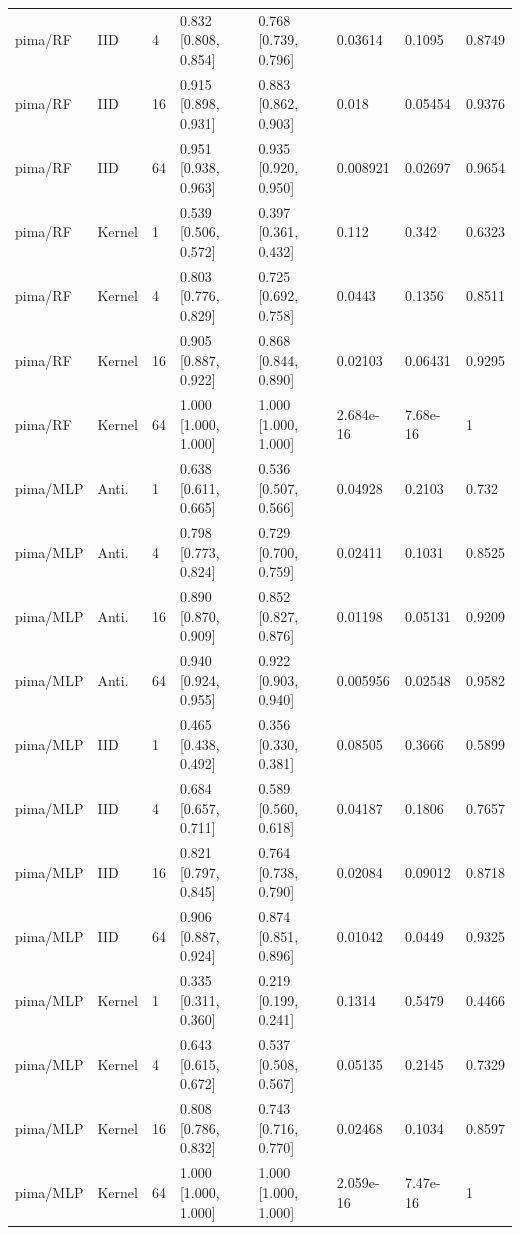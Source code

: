 \begin{tabular}{llllllll}
pima/RF & IID & 4 & 0.832 [0.808, 0.854] & 0.768 [0.739, 0.796] & 0.03614 & 0.1095 & 0.8749 \\
pima/RF & IID & 16 & 0.915 [0.898, 0.931] & 0.883 [0.862, 0.903] & 0.018 & 0.05454 & 0.9376 \\
pima/RF & IID & 64 & 0.951 [0.938, 0.963] & 0.935 [0.920, 0.950] & 0.008921 & 0.02697 & 0.9654 \\
pima/RF & Kernel & 1 & 0.539 [0.506, 0.572] & 0.397 [0.361, 0.432] & 0.112 & 0.342 & 0.6323 \\
pima/RF & Kernel & 4 & 0.803 [0.776, 0.829] & 0.725 [0.692, 0.758] & 0.0443 & 0.1356 & 0.8511 \\
pima/RF & Kernel & 16 & 0.905 [0.887, 0.922] & 0.868 [0.844, 0.890] & 0.02103 & 0.06431 & 0.9295 \\
pima/RF & Kernel & 64 & 1.000 [1.000, 1.000] & 1.000 [1.000, 1.000] & 2.684e-16 & 7.68e-16 & 1 \\
pima/MLP & Anti. & 1 & 0.638 [0.611, 0.665] & 0.536 [0.507, 0.566] & 0.04928 & 0.2103 & 0.732 \\
pima/MLP & Anti. & 4 & 0.798 [0.773, 0.824] & 0.729 [0.700, 0.759] & 0.02411 & 0.1031 & 0.8525 \\
pima/MLP & Anti. & 16 & 0.890 [0.870, 0.909] & 0.852 [0.827, 0.876] & 0.01198 & 0.05131 & 0.9209 \\
pima/MLP & Anti. & 64 & 0.940 [0.924, 0.955] & 0.922 [0.903, 0.940] & 0.005956 & 0.02548 & 0.9582 \\
pima/MLP & IID & 1 & 0.465 [0.438, 0.492] & 0.356 [0.330, 0.381] & 0.08505 & 0.3666 & 0.5899 \\
pima/MLP & IID & 4 & 0.684 [0.657, 0.711] & 0.589 [0.560, 0.618] & 0.04187 & 0.1806 & 0.7657 \\
pima/MLP & IID & 16 & 0.821 [0.797, 0.845] & 0.764 [0.738, 0.790] & 0.02084 & 0.09012 & 0.8718 \\
pima/MLP & IID & 64 & 0.906 [0.887, 0.924] & 0.874 [0.851, 0.896] & 0.01042 & 0.0449 & 0.9325 \\
pima/MLP & Kernel & 1 & 0.335 [0.311, 0.360] & 0.219 [0.199, 0.241] & 0.1314 & 0.5479 & 0.4466 \\
pima/MLP & Kernel & 4 & 0.643 [0.615, 0.672] & 0.537 [0.508, 0.567] & 0.05135 & 0.2145 & 0.7329 \\
pima/MLP & Kernel & 16 & 0.808 [0.786, 0.832] & 0.743 [0.716, 0.770] & 0.02468 & 0.1034 & 0.8597 \\
pima/MLP & Kernel & 64 & 1.000 [1.000, 1.000] & 1.000 [1.000, 1.000] & 2.059e-16 & 7.47e-16 & 1 \\
\bottomrule
\end{tabular}

